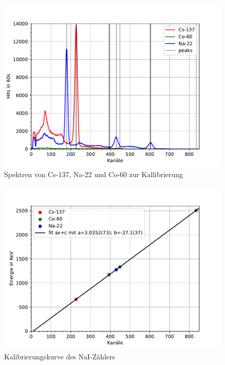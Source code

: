 \documentclass[11pt, a4paper]{article}
\begin{document}
    \begin{figure}[!h]
        \centering
        \includegraphics[width=\textwidth]{Plots/Kalibspektren.pdf}

        \caption{Spektren von Cs-137, Na-22 und Co-60 zur Kallibrierung}
        \label{fig:Kalibspektren}
    \end{figure}

    \begin{figure}[!h]
        \centering
        \includegraphics[width=\textwidth]{Plots/Kanal-Energie.pdf}

        \caption{Kalibrierungskurve des NaI-Zählers}
        \label{fig:Kanal-Energie}
    \end{figure}
\end{document}
